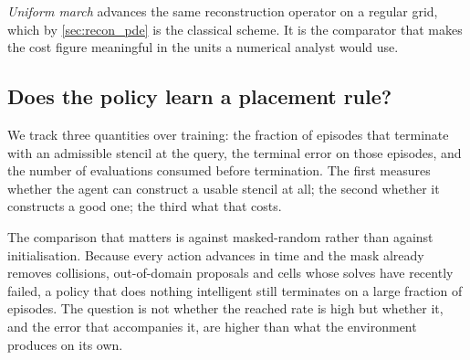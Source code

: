 \emph{Uniform march} advances the same reconstruction operator on a regular
grid, which by \cref{sec:recon_pde} is the classical scheme. It is the
comparator that makes the cost figure meaningful in the units a numerical
analyst would use.


\subsection{Does the policy learn a placement rule?}
\label{sec:results_learn}

We track three quantities over training: the fraction of episodes that
terminate with an admissible stencil at the query, the terminal error on those
episodes, and the number of evaluations consumed before termination. The first
measures whether the agent can construct a usable stencil at all; the second
whether it constructs a good one; the third what that costs.


The comparison that matters is against masked-random rather than against
initialisation. Because every action advances in time and the mask already
removes collisions, out-of-domain proposals and cells whose solves have
recently failed, a policy that does nothing intelligent still terminates on a
large fraction of episodes. The question is not whether the reached rate is
high but whether it, and the error that accompanies it, are higher than what
the environment produces on its own.



